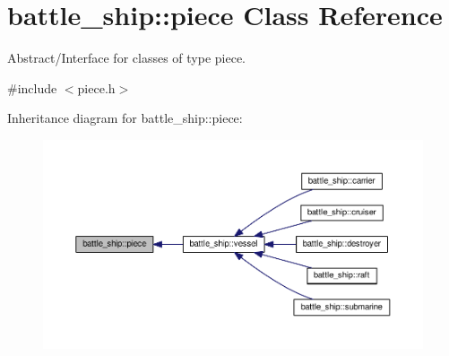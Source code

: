 \hypertarget{classbattle__ship_1_1piece}{}\section{battle\+\_\+ship\+:\+:piece Class Reference}
\label{classbattle__ship_1_1piece}


Abstract/\+Interface for classes of type piece.  




{\ttfamily \#include $<$piece.\+h$>$}



Inheritance diagram for battle\+\_\+ship\+:\+:piece\+:
\nopagebreak
\begin{figure}[H]
\begin{center}
\leavevmode
\includegraphics[width=350pt]{classbattle__ship_1_1piece__inherit__graph}
\end{center}
\end{figure}
